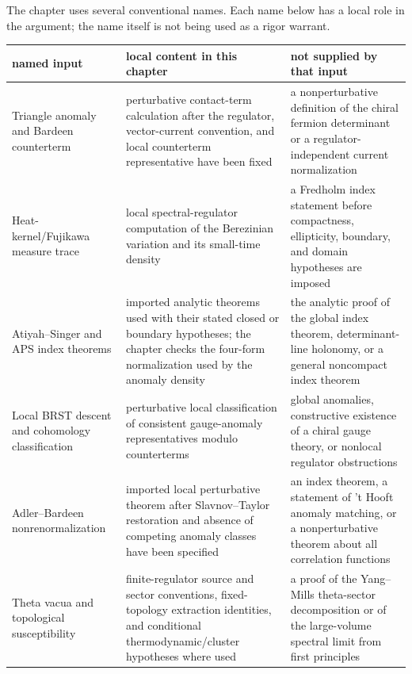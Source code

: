 \begin{remark}
\label{rem:chapter20-named-tool-status-ledger}
The chapter uses several conventional names.  Each name below has a local
role in the argument; the name itself is not being used as a rigor warrant.
\begin{center}
\small
\begin{tabular}{
  >{\raggedright\arraybackslash}p{}
  >{\raggedright\arraybackslash}p{}
  >{\raggedright\arraybackslash}p{}}
\hline
named input & local content in this chapter & not supplied by that input \\
\hline
Triangle anomaly and Bardeen counterterm
& perturbative contact-term calculation after the regulator, vector-current
  convention, and local counterterm representative have been fixed
& a nonperturbative definition of the chiral fermion determinant or a
  regulator-independent current normalization \\
Heat-kernel/Fujikawa measure trace
& local spectral-regulator computation of the Berezinian variation and its
  small-time density
& a Fredholm index statement before compactness, ellipticity, boundary, and
  domain hypotheses are imposed \\
Atiyah--Singer and APS index theorems
& imported analytic theorems used with their stated closed or boundary
  hypotheses; the chapter checks the four-form normalization used by the
  anomaly density
& the analytic proof of the global index theorem, determinant-line holonomy,
  or a general noncompact index theorem \\
Local BRST descent and cohomology classification
& perturbative local classification of consistent gauge-anomaly
  representatives modulo counterterms
& global anomalies, constructive existence of a chiral gauge theory, or
  nonlocal regulator obstructions \\
Adler--Bardeen nonrenormalization
& imported local perturbative theorem after Slavnov--Taylor restoration and
  absence of competing anomaly classes have been specified
& an index theorem, a statement of 't Hooft anomaly matching, or a
  nonperturbative theorem about all correlation functions \\
Theta vacua and topological susceptibility
& finite-regulator source and sector conventions, fixed-topology extraction
  identities, and conditional thermodynamic/cluster hypotheses where used
& a proof of the Yang--Mills theta-sector decomposition or of the large-volume
  spectral limit from first principles \\

\end{tabular}
\end{center}
\end{remark}
